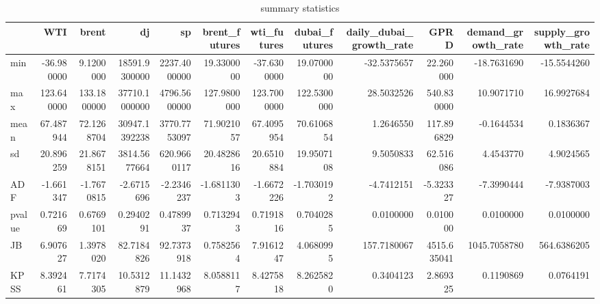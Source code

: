 \begin{table}
\centering
\caption{summary statistics}
\centering
\begin{tabular}[t]{l|r|r|r|r|r|r|r|r|r|r|r}
\hline
  & WTI & brent & dj & sp & brent\_futures & wti\_futures & dubai\_futures & daily\_dubai\_growth\_rate & GPRD & demand\_growth\_rate & supply\_growth\_rate\\
\hline
min & -36.980000 & 9.1200000 & 18591.9300000 & 2237.4000000 & 19.3300000 & -37.6300000 & 19.0700000 & -32.5375657 & 22.260000 & -18.7631690 & -15.5544260\\
\hline
max & 123.640000 & 133.1800000 & 37710.1000000 & 4796.5600000 & 127.9800000 & 123.7000000 & 122.5300000 & 28.5032526 & 540.830000 & 10.9071710 & 16.9927684\\
\hline
mean & 67.487944 & 72.1268704 & 30947.1392238 & 3770.7753097 & 71.9021057 & 67.4095954 & 70.6106854 & 1.2646550 & 117.896829 & -0.1644534 & 0.1836367\\
\hline
sd & 20.896259 & 21.8678151 & 3814.5677664 & 620.9660117 & 20.4828616 & 20.6510884 & 19.9507108 & 9.5050833 & 62.516086 & 4.4543770 & 4.9024565\\
\hline
ADF & -1.661347 & -1.7670815 & -2.6715696 & -2.2346237 & -1.6811303 & -1.6672226 & -1.7030192 & -4.7412151 & -5.323327 & -7.3990444 & -7.9387003\\
\hline
pvalue & 0.721669 & 0.6769101 & 0.2940291 & 0.4789937 & 0.7132943 & 0.7191816 & 0.7040285 & 0.0100000 & 0.010000 & 0.0100000 & 0.0100000\\
\hline
JB & 6.907627 & 1.3978020 & 82.7184826 & 92.7373918 & 0.7582564 & 7.9161247 & 4.0680995 & 157.7180067 & 4515.635041 & 1045.7058780 & 564.6386205\\
\hline
KPSS & 8.392461 & 7.7174305 & 10.5312879 & 11.1432968 & 8.0588117 & 8.4275818 & 8.2625820 & 0.3404123 & 2.869325 & 0.1190869 & 0.0764191\\
\hline
\end{tabular}
\end{table}
